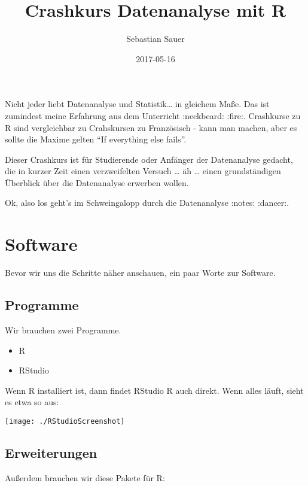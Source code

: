 \documentclass[]{article}
\title{Crashkurs Datenanalyse mit R}
\author{Sebastian Sauer}
\date{2017-05-16}
\providecommand{\tightlist}{%
  \setlength{\itemsep}{0pt}\setlength{\parskip}{0pt}}
\begin{document}
\maketitle

Nicht jeder liebt Datenanalyse und Statistik\ldots{} in gleichem Maße.
Das ist zumindest meine Erfahrung aus dem Unterricht :neckbeard: :fire:.
Crashkurse zu R sind vergleichbar zu Crahskursen zu Französisch - kann
man machen, aber es sollte die Maxime gelten ``If everything else
fails''.

Dieser Crashkurs ist für Studierende oder Anfänger der Datenanalyse
gedacht, die in kurzer Zeit einen verzweifelten Versuch \ldots{} äh
\ldots{} einen grundständigen Überblick über die Datenanalyse erwerben
wollen.

Ok, also los geht's im Schweingalopp durch die Datenanalyse :notes:
:dancer:.

\hypertarget{software}{%
\section{Software}\label{software}}

Bevor wir uns die Schritte näher anschauen, ein paar Worte zur Software.

\hypertarget{programme}{%
\subsection{Programme}\label{programme}}

Wir brauchen zwei Programme.

\begin{itemize}
\tightlist
\item
  R
\item
  RStudio
\end{itemize}

Wenn R installiert ist, dann findet RStudio R auch direkt. Wenn alles
läuft, sieht es etwa so aus:

\begin{center}\texttt{[image: ./RStudioScreenshot]} \end{center}

\hypertarget{erweiterungen}{%
\subsection{Erweiterungen}\label{erweiterungen}}

Außerdem brauchen wir diese Pakete für R:
\end{document}
